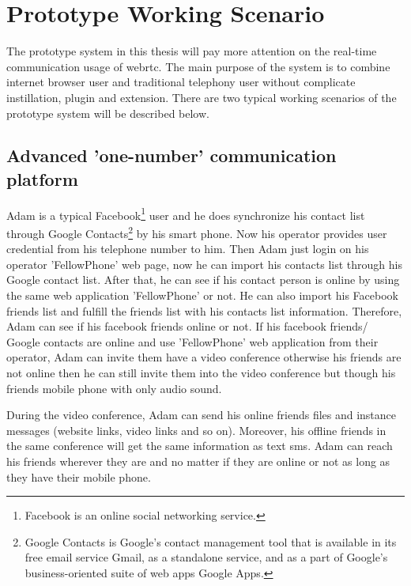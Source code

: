 \section{Prototype Working Scenario}

\noindent The prototype system in this thesis will pay more attention on the real-time communication usage of \gls{webrtc}. The main purpose of the system is to combine internet browser user and traditional telephony user without complicate instillation, plugin and extension. There are two typical working scenarios of the prototype system will be described below.

\subsection{Advanced 'one-number' communication platform}

\par Adam is a typical Facebook\footnote{Facebook is an online social networking service.} user and he does synchronize his contact list through Google Contacts\footnote{Google Contacts is Google's contact management tool that is available in its free email service Gmail, as a standalone service, and as a part of Google's business-oriented suite of web apps Google Apps.\cite{wiki:google_contacts}} by his smart phone. Now his operator provides user credential from his telephone number to him. Then Adam just login on his operator 'FellowPhone' web page, now he can import his contacts list through his Google contact list. After that, he can see if his contact person is online by using the same web application 'FellowPhone' or not. He can also import his Facebook friends list and fulfill the friends list with his contacts list information. Therefore, Adam can see if his facebook friends online or not. If his facebook friends/ Google contacts are online and use 'FellowPhone' web application from their operator, Adam can invite them have a video conference otherwise his friends are not online then he can still invite them into the video conference but though his friends mobile phone with only audio sound.

\par During the video conference, Adam can send his online friends files and instance messages (website links, video links and so on). Moreover, his offline friends in the same conference will get the same information as text \gls{sms}. Adam can reach his friends wherever they are and no matter if they are online or not as long as they have their mobile phone. 

